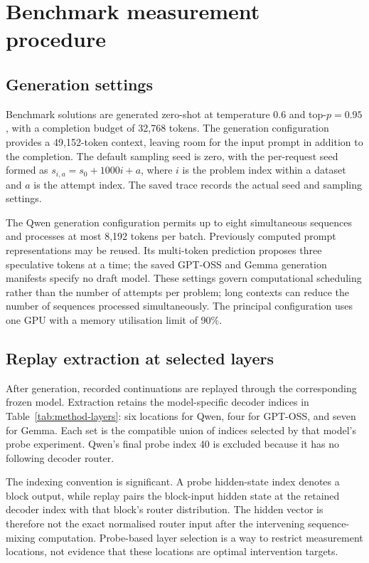 \documentclass[12pt,a4paper,twoside,openright]{book}
\begin{document}
\section{Benchmark measurement procedure}
\label{sec:setup-correlation}

\subsection{Generation settings}

Benchmark solutions are generated zero-shot at temperature 0.6 and
top-$p=0.95$, with a completion budget of 32,768 tokens. The generation
configuration provides a 49,152-token context, leaving room for the input prompt in
addition to the completion. The default sampling seed is zero, with the
per-request seed formed as $s_{i,a}=s_0+1000i+a$, where $i$ is the problem
index within a dataset and $a$ is the attempt index. The saved trace records
the actual seed and sampling settings.

The Qwen generation configuration permits up to eight simultaneous
sequences and processes at most 8,192 tokens per batch. Previously computed
prompt representations may be reused. Its multi-token prediction proposes
three speculative tokens at a time; the saved GPT-OSS and Gemma generation
manifests specify no draft model.
These settings govern computational scheduling rather than the number of
attempts per problem; long contexts can reduce the number of sequences
processed simultaneously. The principal configuration uses one GPU with
a memory utilisation limit of 90\%.

\subsection{Replay extraction at selected layers}

After generation, recorded continuations are replayed through the
corresponding frozen model. Extraction retains the model-specific decoder
indices in Table~\ref{tab:method-layers}: six locations for Qwen, four for
GPT-OSS, and seven for Gemma. Each set is the compatible union of indices
selected by that model's probe experiment. Qwen's final probe index 40 is
excluded because it has no following decoder router.

The indexing convention is significant. A probe hidden-state index denotes
a block output, while replay pairs the block-input hidden state at the
retained decoder index with that block's router distribution. The hidden
vector is therefore not the exact normalised router input after the
intervening sequence-mixing computation. Probe-based layer selection is a
way to restrict measurement locations, not evidence that these locations
are optimal intervention targets.
\end{document}
